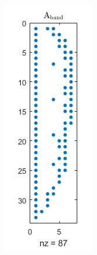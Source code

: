 \documentclass[12pt,a4paper]{article}
\begin{document}
\begin{figure}[H]
\begin{subfigure}[b]{0.21\textwidth}
		\includegraphics[width=\textwidth]{images/band.png}
	\end{subfigure}
\end{figure}
\end{document}

